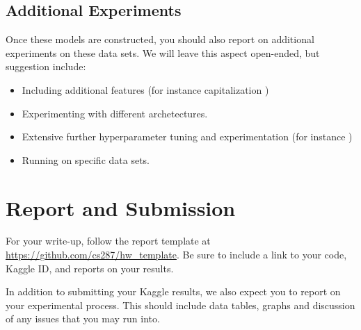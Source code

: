 \documentclass[11pt]{article}
\begin{document}
\subsection{Additional Experiments}

Once these models are constructed, you should also report on
additional experiments on these data sets. We will leave this aspect
open-ended, but suggestion include:

\begin{itemize}
\item Including additional features (for instance capitalization \cite{c&w})
\item Experimenting with different archetectures. 
\item Extensive further hyperparameter tuning and experimentation (for instance \cite{})
\item Running on specific data sets. 
\end{itemize}

\section{Report and Submission}

For your write-up, follow the report template at
\url{https://github.com/cs287/hw_template}. Be sure to include a link
to your code, Kaggle ID, and reports on your results.

In addition to submitting your Kaggle results, we also expect you to report on your 
experimental process. This should include data tables, graphs and discussion of any 
issues that you may run into. 
\end{document}

